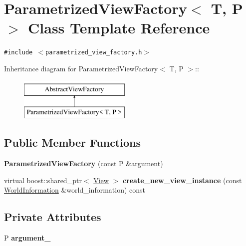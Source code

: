 \hypertarget{class_parametrized_view_factory}{
\section{ParametrizedViewFactory$<$ T, P $>$ Class Template Reference}
\label{class_parametrized_view_factory}
}
{\tt \#include $<$parametrized\_\-view\_\-factory.h$>$}

Inheritance diagram for ParametrizedViewFactory$<$ T, P $>$::\begin{figure}[H]
\begin{center}
\leavevmode
\includegraphics[height=2cm]{class_parametrized_view_factory}
\end{center}
\end{figure}
\subsection*{Public Member Functions}
\begin{CompactItemize}
\item 
\hypertarget{class_parametrized_view_factory_fb2dd21156ea282ac8bd5d008e2d7d55}{
\textbf{ParametrizedViewFactory} (const P \&argument)}
\label{class_parametrized_view_factory_fb2dd21156ea282ac8bd5d008e2d7d55}

\item 
\hypertarget{class_parametrized_view_factory_6ccbba555f6e406416113bd7c81ccab2}{
virtual boost::shared\_\-ptr$<$ \hyperlink{class_view}{View} $>$ \textbf{create\_\-new\_\-view\_\-instance} (const \hyperlink{class_world_information}{WorldInformation} \&world\_\-information) const }
\label{class_parametrized_view_factory_6ccbba555f6e406416113bd7c81ccab2}

\end{CompactItemize}
\subsection*{Private Attributes}
\begin{CompactItemize}
\item 
\hypertarget{class_parametrized_view_factory_1cccdef60401ee4afe6af7d9a15bc0ef}{
P \textbf{argument\_\-}}
\label{class_parametrized_view_factory_1cccdef60401ee4afe6af7d9a15bc0ef}

\end{CompactItemize}



